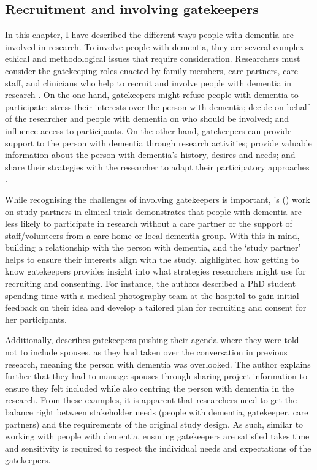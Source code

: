 \subsection{Recruitment and involving gatekeepers}
\label{BL:EthicalDilemmas}
In this chapter, I have described the different ways people with dementia are involved in research. To involve people with dementia, they are several complex ethical and methodological issues that require consideration. Researchers must consider the gatekeeping roles enacted by family members, care partners, care staff, and clinicians who help to recruit and involve people with dementia in research \citep{ries2020ethical}. On the one hand, gatekeepers might refuse people with dementia to participate; stress their interests over the person with dementia; decide on behalf of the researcher and people with dementia on who should be involved; and influence access to participants. On the other hand, gatekeepers can provide support to the person with dementia through research activities; provide valuable information about the person with dementia's history, desires and needs; and share their strategies with the researcher to adapt their participatory approaches \citep{novek2019safe}.

While recognising the challenges of involving gatekeepers is important, \citeauthor{grill2014facilitating}'s (\citeyear{grill2014facilitating}) work on study partners in clinical trials demonstrates that people with dementia are less likely to participate in research without a care partner or the support of staff/volunteers from a care home or local dementia group. With this in mind, building a relationship with the person with dementia, and the `study partner' helps to ensure their interests align with the study. \cite{bartlett2019strategies} highlighted how getting to know gatekeepers provides insight into what strategies researchers might use for recruiting and consenting. For instance, the authors described a PhD student spending time with a medical photography team at the hospital to gain initial feedback on their idea and develop a tailored plan for recruiting and consent for her participants. 

Additionally, \cite{thoft2021journey} describes gatekeepers pushing their agenda where they were told not to include spouses, as they had taken over the conversation in previous research, meaning the person with dementia was overlooked. The author explains further that they had to manage spouses through sharing project information to ensure they felt included while also centring the person with dementia in the research. From these examples, it is apparent that researchers need to get the balance right between stakeholder needs (people with dementia, gatekeeper, care partners) and the requirements of the original study design. As such, similar to working with people with dementia, ensuring gatekeepers are satisfied takes time and sensitivity is required to respect the individual needs and expectations of the gatekeepers.

